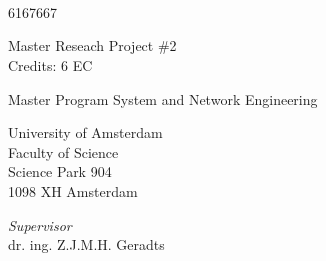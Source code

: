 
\begin{titlepage}

\begin{addmargin}[-1cm]{-1cm}
\begin{center}
\large

\hfill
\vfill

\begingroup
\begin{huge}
\color{Maroon}\spacedallcaps{\myTitle} \\ \medskip %
\end{huge}
\begin{Large}
\spacedlowsmallcaps{\mySubtitle}\\ \medskip %
\end{Large}

\endgroup
\bigskip

\vspace{1.5cm}
\bigskip

\\
6167667

\vspace{1.5cm}

Master Reseach Project \#2\\
Credits: 6 EC

\vspace{0.5cm}

Master Program System and Network Engineering

\vspace{0.25cm}

University of Amsterdam\\
Faculty of Science\\
Science Park 904\\
1098 XH Amsterdam

\vspace{2cm}

\emph{Supervisor}\\
dr. ing. Z.J.M.H. Geradts


\end{center}
\end{addmargin}
\end{titlepage}
